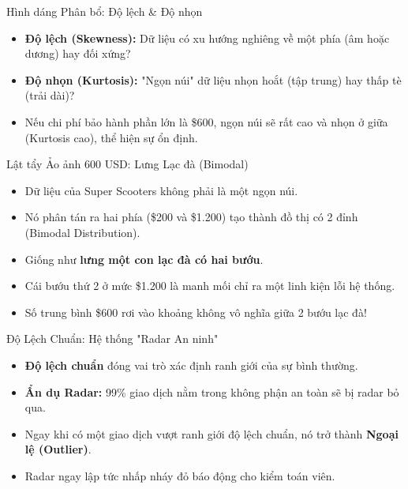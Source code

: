 \documentclass[aspectratio=169,12pt]{beamer}
\begin{document}
\begin{frame}{Hình dáng Phân bổ: Độ lệch \& Độ nhọn}
    \begin{itemize}
        \item \textbf{Độ lệch (Skewness):} Dữ liệu có xu hướng nghiêng về một phía (âm hoặc dương) hay đối xứng?
        \item \textbf{Độ nhọn (Kurtosis):} "Ngọn núi" dữ liệu nhọn hoắt (tập trung) hay thấp tè (trải dài)?
        \item Nếu chi phí bảo hành phần lớn là \$600, ngọn núi sẽ rất cao và nhọn ở giữa (Kurtosis cao), thể hiện sự ổn định.
    \end{itemize}
\end{frame}

\begin{frame}{Lật tẩy Ảo ảnh 600 USD: Lưng Lạc đà (Bimodal)}
    \begin{itemize}
        \item Dữ liệu của Super Scooters không phải là một ngọn núi.
        \item Nó phân tán ra hai phía (\$200 và \$1.200) tạo thành đồ thị có 2 đỉnh (Bimodal Distribution).
        \item Giống như \textbf{lưng một con lạc đà có hai bướu}.
        \item Cái bướu thứ 2 ở mức \$1.200 là manh mối chỉ ra một linh kiện lỗi hệ thống.
        \item Số trung bình \$600 rơi vào khoảng không vô nghĩa giữa 2 bướu lạc đà!
    \end{itemize}
\end{frame}

\begin{frame}{Độ Lệch Chuẩn: Hệ thống "Radar An ninh"}
    \begin{itemize}
        \item \textbf{Độ lệch chuẩn} đóng vai trò xác định ranh giới của sự bình thường.
        \item \textbf{Ẩn dụ Radar:} 99\% giao dịch nằm trong không phận an toàn sẽ bị radar bỏ qua.
        \item Ngay khi có một giao dịch vượt ranh giới độ lệch chuẩn, nó trở thành \textbf{Ngoại lệ (Outlier)}.
        \item Radar ngay lập tức nhấp nháy đỏ báo động cho kiểm toán viên.
    \end{itemize}
\end{frame}


\end{document}
